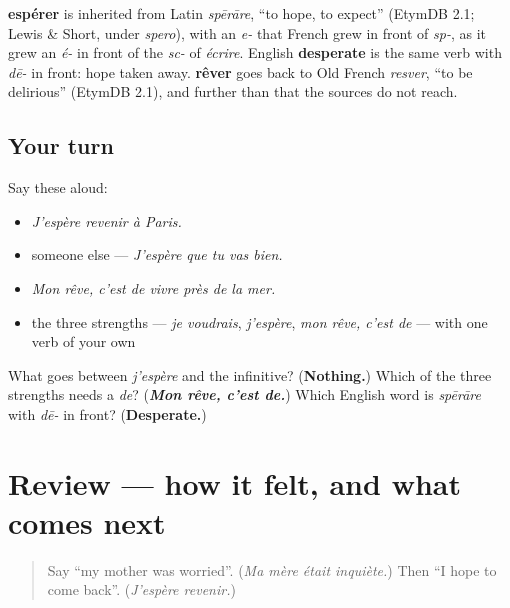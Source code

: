 \begin{cousinweb}
\textbf{espérer} is inherited from Latin \emph{spērāre}, \textquotedblleft{}to hope, to expect\textquotedblright{} (EtymDB 2.1; Lewis \& Short, under \emph{spero}), with an \emph{e-} that French grew in front of \emph{sp-}, as it grew an \emph{é-} in front of the \emph{sc-} of \emph{écrire}. English \textbf{desperate} is the same verb with \emph{dē-} in front: hope taken away. \textbf{rêver} goes back to Old French \emph{resver}, \textquotedblleft{}to be delirious\textquotedblright{} (EtymDB 2.1), and further than that the sources do not reach.
\end{cousinweb}

\subsection*{Your turn}
Say these aloud:

\begin{itemize}
\raggedright
  \item \emph{J'espère revenir à Paris.}
  \item someone else — \emph{J'espère que tu vas bien.}
  \item \emph{Mon rêve, c'est de vivre près de la mer.}
  \item the three strengths — \emph{je voudrais}, \emph{j'espère}, \emph{mon rêve, c'est de} — with one verb of your own
\end{itemize}

\begin{tcolorbox}[breakable,colback=teal!4,colframe=teal!35!black,title={Before you move on}]
What goes between \emph{j'espère} and the infinitive? (\textbf{Nothing.}) Which of the three strengths needs a \emph{de}? (\emph{\textbf{Mon rêve, c'est de.}}) Which English word is \emph{spērāre} with \emph{dē-} in front? (\textbf{Desperate.})
\end{tcolorbox}
\section[(review)]{Review — how it felt, and what comes next}

\label{lesson:FR-C264-revision-sentiments}



\begin{quote}
Say \textquotedblleft{}my mother was worried\textquotedblright{}. (\emph{Ma mère était inquiète.}) Then \textquotedblleft{}I hope to come back\textquotedblright{}. (\emph{J'espère revenir.})
\end{quote}

